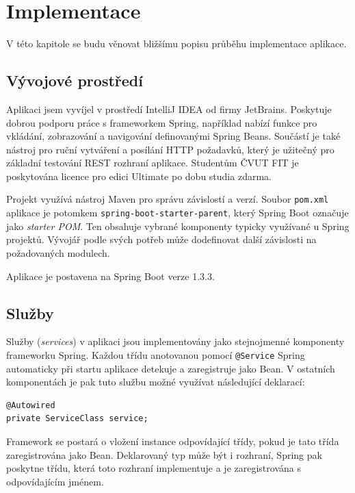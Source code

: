 \documentclass[thesis=B,czech]{FITthesis}[2012/06/26]
\begin{document}

\chapter{Implementace}
	\label{chapter:implementation}
	
	V této kapitole se budu věnovat bližšímu popisu průběhu implementace aplikace. %
	
	\section{Vývojové prostředí}
		Aplikaci jsem vyvíjel v prostředí IntelliJ IDEA od firmy JetBrains. Poskytuje dobrou podporu práce s frameworkem Spring, například nabízí funkce pro vkládání, zobrazování a navigování definovanými Spring Beans. Součástí je také nástroj pro ruční vytváření a posílání HTTP požadavků, který je užitečný pro základní testování REST rozhraní aplikace. Studentům ČVUT FIT je poskytována licence pro edici Ultimate po dobu studia zdarma.
	
		Projekt využívá nástroj Maven pro správu závislostí a verzí. Soubor \texttt{pom.xml} aplikace je potomkem \texttt{spring-boot-starter-parent}, který Spring Boot označuje jako \textit{starter POM}. Ten obsahuje vybrané komponenty typicky využívané u Spring projektů. Vývojář podle svých potřeb může dodefinovat další závislosti na požadovaných modulech.
		
		Aplikace je postavena na Spring Boot verze 1.3.3.
				
	\section{Služby}
		Služby (\textit{services}) v aplikaci jsou implementovány jako stejnojmenné komponenty frameworku Spring. Každou třídu anotovanou pomocí \texttt{@Service} Spring automaticky při startu aplikace detekuje a zaregistruje jako Bean. V ostatních komponentách je pak tuto službu možné využívat následující deklarací:
		\begin{Verbatim}
@Autowired
private ServiceClass service;
		\end{Verbatim}
		
		Framework se postará o vložení instance odpovídající třídy, pokud je tato třída zaregistrována jako Bean. Deklarovaný typ může být i rozhraní, Spring pak poskytne třídu, která toto rozhraní implementuje a je zaregistrována s odpovídajícím jménem.
		
\end{document}
